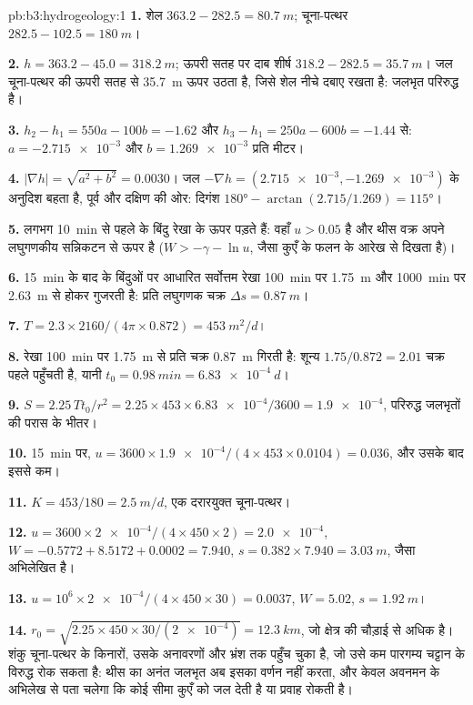 \begin{solution}{pb:b3:hydrogeology:1}
\textbf{1.} शेल $363.2 - 282.5 = \qty{80.7}{m}$; चूना-पत्थर $282.5 -
102.5 = \qty{180}{m}$।

\textbf{2.} $h = 363.2 - 45.0 = \qty{318.2}{m}$; ऊपरी सतह पर दाब शीर्ष
$318.2 - 282.5 = \qty{35.7}{m}$। जल चूना-पत्थर की ऊपरी सतह से
\qty{35.7}{m} ऊपर उठता है, जिसे शेल नीचे दबाए रखता है: जलभृत परिरुद्ध है।

\textbf{3.} $h_2 - h_1 = 550a - 100b = -1.62$ और $h_3 - h_1 = 250a
- 600b = -1.44$ से: $a = \num{-2.715e-3}$ और $b = \num{1.269e-3}$ प्रति
मीटर।

\textbf{4.} $|\nabla h| = \sqrt{a^2 + b^2} = \num{0.0030}$। जल
$-\nabla h = (\num{2.715e-3}, \num{-1.269e-3})$ के अनुदिश बहता है, पूर्व और
दक्षिण की ओर: दिगंश $\ang{180} - \arctan(2.715/1.269) = \ang{115}$।

\textbf{5.} लगभग \qty{10}{min} से पहले के बिंदु रेखा के ऊपर पड़ते हैं: वहाँ
$u > 0.05$ है और थीस वक्र अपने लघुगणकीय सन्निकटन से ऊपर है
($W > -\gamma - \ln u$, जैसा कुएँ के फलन के आरेख से दिखता है)।

\textbf{6.} \qty{15}{min} के बाद के बिंदुओं पर आधारित सर्वोत्तम रेखा
\qty{100}{min} पर \qty{1.75}{m} और \qty{1000}{min} पर \qty{2.63}{m} से
होकर गुजरती है: प्रति लघुगणक चक्र $\Delta s = \qty{0.87}{m}$।

\textbf{7.} $T = 2.3\times2160/(4\pi\times0.872) = \qty{453}{m^2/d}$।

\textbf{8.} रेखा \qty{100}{min} पर \qty{1.75}{m} से प्रति चक्र
\qty{0.87}{m} गिरती है: शून्य $1.75/0.872 = 2.01$ चक्र पहले पहुँचती है,
यानी $t_0 = \qty{0.98}{min} = \qty{6.83e-4}{d}$।

\textbf{9.} $S = 2.25\,Tt_0/r^2 = 2.25\times453\times\num{6.83e-4}/3600 =
\num{1.9e-4}$, परिरुद्ध जलभृतों की परास के भीतर।

\textbf{10.} \qty{15}{min} पर, $u = 3600\times\num{1.9e-4}/(4\times453
\times0.0104) = \num{0.036}$, और उसके बाद इससे कम।

\textbf{11.} $K = 453/180 = \qty{2.5}{m/d}$, एक दरारयुक्त चूना-पत्थर।

\textbf{12.} $u = 3600\times\num{2e-4}/(4\times450\times2) =
\num{2.0e-4}$, $W = -0.5772 + 8.5172 + 0.0002 = \num{7.940}$, $s =
0.382\times7.940 = \qty{3.03}{m}$, जैसा अभिलेखित है।

\textbf{13.} $u = 10^6\times\num{2e-4}/(4\times450\times30) =
\num{0.0037}$, $W = \num{5.02}$, $s = \qty{1.92}{m}$।

\textbf{14.} $r_0 = \sqrt{2.25\times450\times30/(\num{2e-4})} =
\qty{12.3}{km}$, जो क्षेत्र की चौड़ाई से अधिक है। शंकु चूना-पत्थर के
किनारों, उसके अनावरणों और भ्रंश तक पहुँच चुका है, जो उसे कम पारगम्य
चट्टान के विरुद्ध रोक सकता है: थीस का अनंत जलभृत अब इसका वर्णन नहीं
करता, और केवल अवनमन के अभिलेख से पता चलेगा कि कोई सीमा कुएँ को जल
देती है या प्रवाह रोकती है।


\end{solution}
